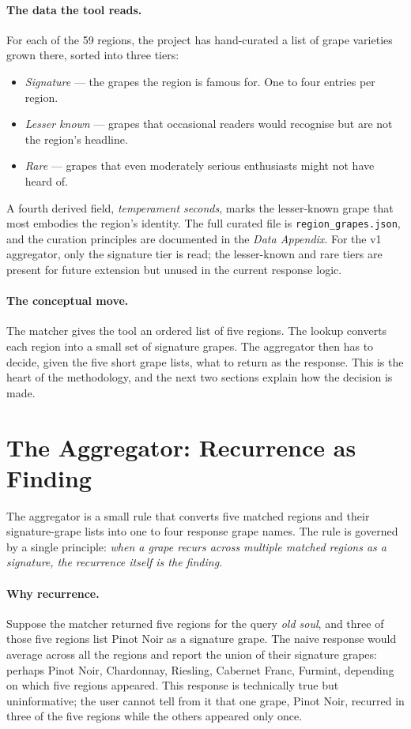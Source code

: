 \documentclass[11pt]{article}
\begin{document}
\paragraph{The data the tool reads.}
For each of the 59 regions, the project has hand-curated a list of grape varieties grown there, sorted into three tiers:

\begin{itemize}[leftmargin=2em,itemsep=0.1em]
\item \emph{Signature} --- the grapes the region is famous for. One to four entries per region.
\item \emph{Lesser known} --- grapes that occasional readers would recognise but are not the region's headline.
\item \emph{Rare} --- grapes that even moderately serious enthusiasts might not have heard of.
\end{itemize}

A fourth derived field, \emph{temperament seconds}, marks the lesser-known grape that most embodies the region's identity. The full curated file is \texttt{region\_grapes.json}, and the curation principles are documented in the \emph{Data Appendix}. For the v1 aggregator, only the signature tier is read; the lesser-known and rare tiers are present for future extension but unused in the current response logic.

\paragraph{The conceptual move.}
The matcher gives the tool an ordered list of five regions. The lookup converts each region into a small set of signature grapes. The aggregator then has to decide, given the five short grape lists, what to return as the response. This is the heart of the methodology, and the next two sections explain how the decision is made.

\section{The Aggregator: Recurrence as Finding}

The aggregator is a small rule that converts five matched regions and their signature-grape lists into one to four response grape names. The rule is governed by a single principle: \emph{when a grape recurs across multiple matched regions as a signature, the recurrence itself is the finding.}

\paragraph{Why recurrence.}
Suppose the matcher returned five regions for the query \emph{old soul}, and three of those five regions list Pinot Noir as a signature grape. The naive response would average across all the regions and report the union of their signature grapes: perhaps Pinot Noir, Chardonnay, Riesling, Cabernet Franc, Furmint, depending on which five regions appeared. This response is technically true but uninformative; the user cannot tell from it that one grape, Pinot Noir, recurred in three of the five regions while the others appeared only once.
\end{document}
